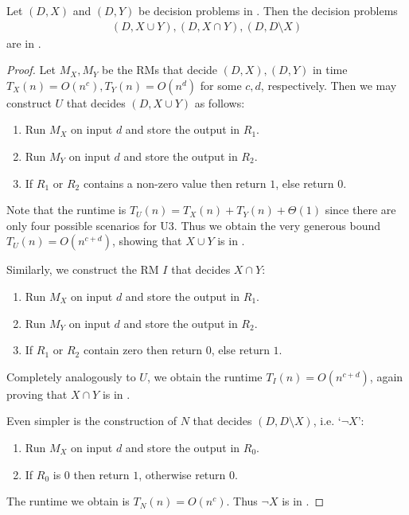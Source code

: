 \documentclass{article}
\begin{document}
\begin{claim*}[b]
    Let $(D,X)$ and $(D,Y)$ be decision problems in \ptime. Then the decision problems
    \begin{align*}
        (D,X\cup Y), (D,X\cap Y), (D,D\setminus X)
    \end{align*}
    are in \ptime.
    \begin{proof}
        Let $M_X,M_Y$ be the RMs that decide $(D,X),(D,Y)$ in time $T_X(n)=O(n^c),T_Y(n)=O(n^d)$ for some $c,d$, 
        respectively. Then we may construct $U$ that decides $(D,X\cup Y)$ as follows:
        \begin{enumerate}[label=U\arabic*]
            \item Run $M_X$ on input $d$ and store the output in $R_1$.
            \item Run $M_Y$ on input $d$ and store the output in $R_2$.
            \item If $R_1$ or $R_2$ contains a non-zero value then return $1$, else return $0$.
        \end{enumerate}
        Note that the runtime is $T_U(n)=T_X(n)+T_Y(n)+\Theta(1)$ since there are only four possible scenarios 
        for U3. Thus we obtain the very generous bound $T_U(n)=O(n^{c+d})$, showing that $X\cup Y$ is in \ptime.

        Similarly, we construct the RM $I$ that decides $X\cap Y$:
        \begin{enumerate}[label=I\arabic*]
            \item Run $M_X$ on input $d$ and store the output in $R_1$.
            \item Run $M_Y$ on input $d$ and store the output in $R_2$.
            \item If $R_1$ or $R_2$ contain zero then return $0$, else return $1$.
        \end{enumerate}
        Completely analogously to $U$, we obtain the runtime $T_I(n)=O(n^{c+d})$, again proving that 
        $X\cap Y$ is in \ptime.

        Even simpler is the construction of $N$ that decides $(D, D\setminus X)$, i.e. `$\neg X$':
        \begin{enumerate}[label=N\arabic*]
            \item Run $M_X$ on input $d$ and store the output in $R_0$.
            \item If $R_0$ is $0$ then return $1$, otherwise return $0$.
        \end{enumerate}
        The runtime we obtain is $T_N(n)=O(n^c)$. Thus $\neg X$ is in \ptime.
    \end{proof}
\end{claim*}
\end{document}
